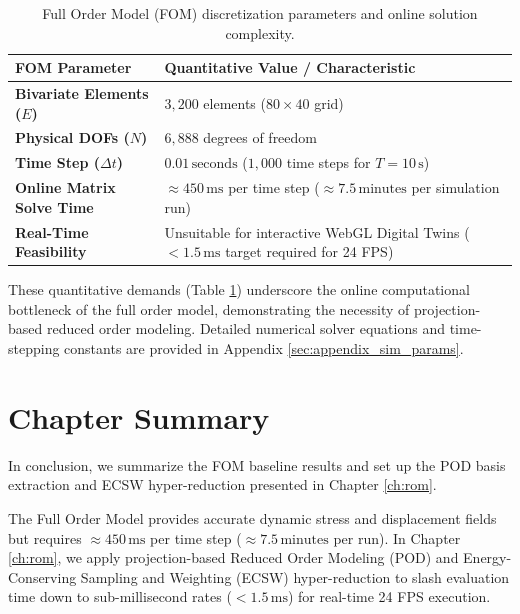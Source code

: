 \begin{table}[htbp]
    \centering
    \caption{Full Order Model (FOM) discretization parameters and online solution complexity.}
    \label{tab:fom_parameters}
    \begin{tabular}{l p{9.0cm}}
        \toprule
        \textbf{FOM Parameter}            & \textbf{Quantitative Value / Characteristic}                                              \\
        \midrule
        \textbf{Bivariate Elements ($E$)} & $3,200$ elements ($80 \times 40$ grid)                                                    \\
        \textbf{Physical DOFs ($N$)}      & $6,888$ degrees of freedom                                                                \\
        \textbf{Time Step ($\Delta t$)}   & $0.01\,\text{seconds}$ ($1,000$ time steps for $T=10\,\text{s}$)                          \\
        \textbf{Online Matrix Solve Time} & $\approx 450\,\text{ms}$ per time step ($\approx 7.5\,\text{minutes}$ per simulation run) \\
        \textbf{Real-Time Feasibility}    & Unsuitable for interactive WebGL Digital Twins ($<1.5\,\text{ms}$ target required for 24 FPS) \\
        \bottomrule
    \end{tabular}
\end{table}

These quantitative demands (Table \ref{tab:fom_parameters}) underscore the online computational bottleneck of the full order model, demonstrating the necessity of projection-based reduced order modeling. Detailed numerical solver equations and time-stepping constants are provided in Appendix \ref{sec:appendix_sim_params}.

\section{Chapter Summary}

In conclusion, we summarize the FOM baseline results and set up the POD basis extraction and ECSW hyper-reduction presented in Chapter \ref{ch:rom}.

\begin{tcolorbox}[colback=lightbg, colframe=accentcyan, title=\textbf{Key Takeaway}, fonttitle=\bfseries]
    The Full Order Model provides accurate dynamic stress and displacement fields but requires $\approx 450\,\text{ms}$ per time step ($\approx 7.5\,\text{minutes}$ per run). In Chapter \ref{ch:rom}, we apply projection-based Reduced Order Modeling (POD) and Energy-Conserving Sampling and Weighting (ECSW) hyper-reduction to slash evaluation time down to sub-millisecond rates ($<1.5\,\text{ms}$) for real-time 24 FPS execution.
\end{tcolorbox}
